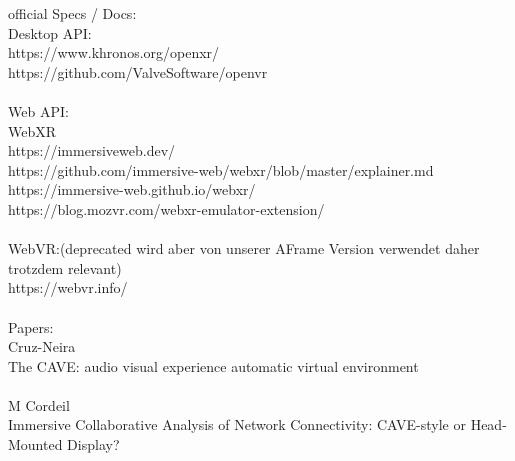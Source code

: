 official Specs / Docs: 
\\
Desktop API:\\
https://www.khronos.org/openxr/ \\
https://github.com/ValveSoftware/openvr \\
\\
Web API:\\
   WebXR\\
https://immersiveweb.dev/ \\
https://github.com/immersive-web/webxr/blob/master/explainer.md \\
https://immersive-web.github.io/webxr/ \\
https://blog.mozvr.com/webxr-emulator-extension/ \\
\\
WebVR:(deprecated wird aber von unserer AFrame Version verwendet daher trotzdem relevant)\\
https://webvr.info/ \\
\\
Papers:\\
Cruz-Neira\\
The CAVE: audio visual experience automatic virtual environment\\
\\
M Cordeil\\
Immersive Collaborative Analysis of Network Connectivity: CAVE-style or Head-Mounted Display?\\
\\